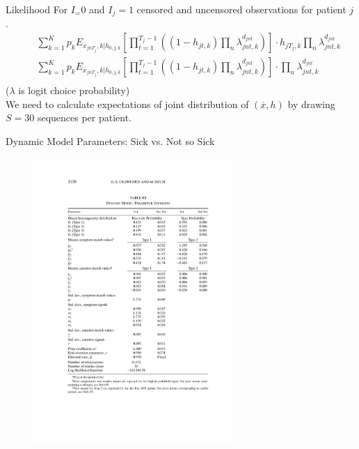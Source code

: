 \documentclass[xcolor=pdftex,dvipsnames,table,mathserif]{beamer}
\begin{document}
\begin{frame}{Likelihood}
For $I_=0$ and $I_j=1$ censored and uncensored observations for patient $j$.
\begin{eqnarray*}
&&\sum_{k=1}^K p_k E_{\overline{x}_{jn T_{j}},k | h_{0,j,k}} \left[ \prod_{t=1}^{T_j-1} \left((1-h_{jt,k}) \prod_n \lambda_{jnt,k}^{d_{jnt}} \right) \right] \cdot h_{jT_j,k} \prod_n  \lambda_{jnt,k}^{d_{jnt}}\\
&&\sum_{k=1}^K p_k E_{\overline{x}_{jn T_{j}},k | h_{0,j,k}} \left[ \prod_{t=1}^{T_j-1} \left((1-h_{jt,k}) \prod_n \lambda_{jnt,k}^{d_{jnt}} \right) \right] \cdot \prod_n  \lambda_{jnt,k}^{d_{jnt}}\\
\end{eqnarray*}
($\lambda$ is logit choice probability)\\
We need to calculate expectations of joint distribution of $(\overline{x},h)$ by drawing $S=30$ sequences  per patient.
\end{frame}


\begin{frame}{Dynamic Model Parameters: Sick vs. Not so Sick}
\begin{figure}[htbp]
\begin{center}
\includegraphics[width=7.5cm]{resources/crawfordshumparam.pdf}
\label{default}
\end{center}
\end{figure}
\end{frame}
\end{document}
